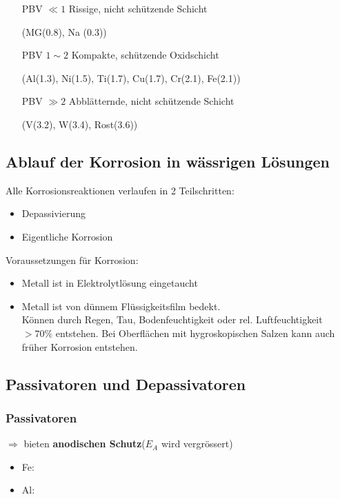     \begin{minipage}{0.05\linewidth}
    \end{minipage}
    \hfill
    \begin{minipage}{0.91\linewidth}
        \begin{itemize}
            \item[PBV $\ll 1$] Rissige, nicht schützende Schicht 
            \item[]            (MG(0.8), Na (0.3))
            \item[PBV $1 \sim 2$] Kompakte, schützende Oxidschicht
            \item[]               (Al(1.3), Ni(1.5), Ti(1.7), Cu(1.7), Cr(2.1), Fe(2.1))
            \item[PBV $\gg 2$] Abblätternde, nicht schützende Schicht 
            \item[]            (V(3.2), W(3.4), Rost(3.6))
        \end{itemize}
    \end{minipage}

\subsection{Ablauf der Korrosion in wässrigen Lösungen}
    Alle Korrosionsreaktionen verlaufen in 2 Teilschritten:
    \begin{itemize}
        \item Depassivierung
        \item Eigentliche Korrosion
    \end{itemize}

    Voraussetzungen für Korrosion:
    \begin{itemize}
        \item Metall ist in Elektrolytlösung eingetaucht
        \item Metall ist von dünnem Flüssigkeitsfilm bedekt.\\
        Können durch Regen, Tau, Bodenfeuchtigkeit oder rel. Luftfeuchtigkeit $> 70\%$ entstehen. Bei Oberflächen mit hygroskopischen Salzen kann auch früher Korrosion entstehen.
    \end{itemize}
\subsection{Passivatoren und Depassivatoren}
    \subsubsection{Passivatoren}
        $\Rightarrow$ bieten \textbf{anodischen Schutz}($E_A$ wird vergrössert)
        \begin{itemize}
            \item Fe: 
            \item Al: 
        \end{itemize}
        
